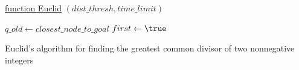 \documentclass[conference]{IEEEtran} \usepackage[T1]{fontenc} \usepackage[backend=biber, style=ieee]{biblatex}
\begin{document}
\begin{algorithm}

    \underline{function Euclid} $(dist\_thresh, time\_limit)$\;

     \State $\mathit{q\_old} \gets closest\_node\_to\_goal$
     \State $first\gets\true$

    \caption{Euclid's algorithm for finding the greatest common divisor of two nonnegative integers}
\end{algorithm}

       
\end{document}
